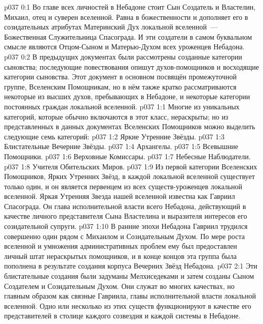 \author{Блистательная Вечерняя Звезда}
\vs p037 0:1 Во главе всех личностей в Небадоне стоит Сын Создатель и Властелин, Михаил, отец и суверен вселенной. Равна в божественности и дополняет его в созидательных атрибутах Материнский Дух локальной вселенной~--- Божественная Служительница Спасограда. И эти создатели в самом буквальном смысле являются Отцом\hyp{}Сыном и Матерью\hyp{}Духом всех уроженцев Небадона.
\vs p037 0:2 В предыдущих документах были рассмотрены созданные категории сыновства; последующие повествования опишут духов\hyp{}помощников и восходящие категории сыновства. Этот документ в основном посвящён промежуточной группе, Вселенским Помощникам, но в нём также кратко рассматриваются некоторые из высших духов, пребывающих в Небадоне, и некоторые категории постоянных граждан локальной вселенной.
\vs p037 1:1 Многие из уникальных категорий, которые обычно включаются в этот класс, нераскрыты; но из представленных в данных документах Вселенских Помощников можно выделить следующие семь категорий:
\vs p037 1:2 Яркие Утренние Звёзды.
\vs p037 1:3 Блистательные Вечерние Звёзды.
\vs p037 1:4 Архангелы.
\vs p037 1:5 Всевышние Помощники.
\vs p037 1:6 Верховные Комиссары.
\vs p037 1:7 Небесные Наблюдатели.
\vs p037 1:8 Учителя Обительских Миров.
\vs p037 1:9 \pc Из первой категории Вселенских Помощников, Ярких Утренних Звёзд, в каждой локальной вселенной существует только один, и он является первенцем из всех существ\hyp{}уроженцев локальной вселенной. Яркая Утренняя Звезда нашей вселенной известна как Гавриил Спасограда. Он глава исполнительной власти всего Небадона, действующий в качестве личного представителя Сына Властелина и выразителя интересов его созидательной супруги.
\vs p037 1:10 В ранние эпохи Небадона Гавриил трудился совершенно один рядом с Михаилом и Созидательным Духом. По мере роста вселенной и умножения административных проблем ему был предоставлен личный штат нераскрытых помощников, и в конце концов эта группа была пополнена в результате создания корпуса Вечерних Звёзд Небадона.
\vs p037 2:1 Эти блистательные создания были задуманы Мелхиседеками и затем созданы Сыном Создателем и Созидательным Духом. Они служат во многих качествах, но главным образом как связные Гавриила, главы исполнительной власти локальной вселенной. Одно или несколько из этих существ функционируют в качестве его представителей в столице каждого созвездия и каждой системы в Небадоне.
